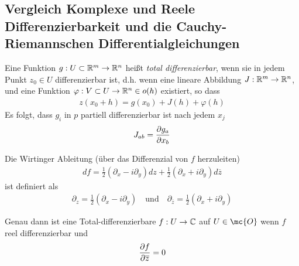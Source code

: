 \documentclass[ngerman]{report}
\begin{document}
\subsection{Vergleich Komplexe und Reele Differenzierbarkeit und die Cauchy-Riemannschen Differentialgleichungen}
\begin{definition}
    Eine Funktion $g:U\subset\R^m\to\R^n$ heißt \emph{total differenzierbar}, wenn sie in jedem Punkt $z_0\in U$ differenzierbar ist, d.h. wenn eine lineare Abbildung $J:\R^m\to\R^n$, und eine Funktion $\varphi:V\subset U \to \R^n\in o(h)$  existiert, so dass
    \begin{align*}
        z(x_0+h) = g(x_0) + J(h) + \varphi(h)
    \end{align*}
    Es folgt, dass $g_i$ in $p$ partiell differenzierbar ist nach jedem $x_j$
    \begin{align*}
        J_{ab} = \pder[g_a]{x_b}
    \end{align*}
\end{definition}
\begin{definition}
    Die Wirtinger Ableitung (über das Differenzial von $f$ herzuleiten)
    \begin{align*}
        df = \frac{1}{2}(\partial_x-i\partial_y)dz + \frac{1}{2}(\partial_x+i\partial_y)d\overline{z}
    \end{align*}
    ist definiert als
    \begin{align*}
        \partial_z = \frac{1}{2}(\partial_x-i\partial_y)\quad\text{und}\quad \partial_{\overline{z}} = \frac{1}{2}(\partial_x+i\partial_y)
    \end{align*}
\end{definition}
\begin{lemma} Genau dann ist eine Total-differenzierbare $f:U\to\C$ auf $U\in \mc{O}$ wenn $f$ reel differenzierbar und
    \begin{align*}
        \pder[f]{\overline{z}} = 0 
    \end{align*}
\end{lemma}
\end{document}
